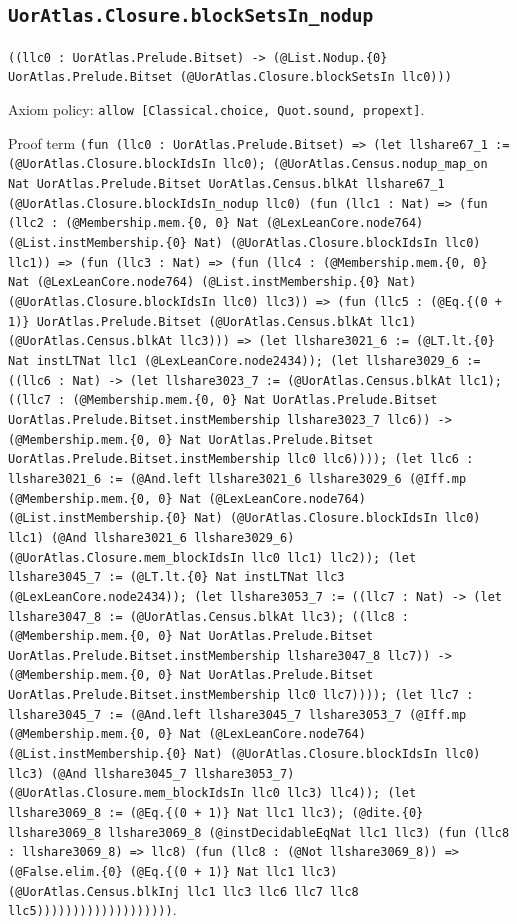 \documentclass[11pt]{article}
\begin{document}
\subsection*{\texttt{UorAtlas.Closure.blockSetsIn\_nodup}}
\noindent\texttt{((llc0 : UorAtlas.Prelude.Bitset) -> (@List.Nodup.\{0\} UorAtlas.Prelude.Bitset (@UorAtlas.Closure.blockSetsIn llc0)))}\par
\noindent Axiom policy: \texttt{allow [Classical.choice, Quot.sound, propext]}.\par
\noindent Proof term \texttt{(fun (llc0 : UorAtlas.Prelude.Bitset) => (let llshare67\_1 := (@UorAtlas.Closure.blockIdsIn llc0); (@UorAtlas.Census.nodup\_map\_on Nat UorAtlas.Prelude.Bitset UorAtlas.Census.blkAt llshare67\_1 (@UorAtlas.Closure.blockIdsIn\_nodup llc0) (fun (llc1 : Nat) => (fun (llc2 : (@Membership.mem.\{0, 0\} Nat (@LexLeanCore.node764) (@List.instMembership.\{0\} Nat) (@UorAtlas.Closure.blockIdsIn llc0) llc1)) => (fun (llc3 : Nat) => (fun (llc4 : (@Membership.mem.\{0, 0\} Nat (@LexLeanCore.node764) (@List.instMembership.\{0\} Nat) (@UorAtlas.Closure.blockIdsIn llc0) llc3)) => (fun (llc5 : (@Eq.\{(0 + 1)\} UorAtlas.Prelude.Bitset (@UorAtlas.Census.blkAt llc1) (@UorAtlas.Census.blkAt llc3))) => (let llshare3021\_6 := (@LT.lt.\{0\} Nat instLTNat llc1 (@LexLeanCore.node2434)); (let llshare3029\_6 := ((llc6 : Nat) -> (let llshare3023\_7 := (@UorAtlas.Census.blkAt llc1); ((llc7 : (@Membership.mem.\{0, 0\} Nat UorAtlas.Prelude.Bitset UorAtlas.Prelude.Bitset.instMembership llshare3023\_7 llc6)) -> (@Membership.mem.\{0, 0\} Nat UorAtlas.Prelude.Bitset UorAtlas.Prelude.Bitset.instMembership llc0 llc6)))); (let llc6 : llshare3021\_6 := (@And.left llshare3021\_6 llshare3029\_6 (@Iff.mp (@Membership.mem.\{0, 0\} Nat (@LexLeanCore.node764) (@List.instMembership.\{0\} Nat) (@UorAtlas.Closure.blockIdsIn llc0) llc1) (@And llshare3021\_6 llshare3029\_6) (@UorAtlas.Closure.mem\_blockIdsIn llc0 llc1) llc2)); (let llshare3045\_7 := (@LT.lt.\{0\} Nat instLTNat llc3 (@LexLeanCore.node2434)); (let llshare3053\_7 := ((llc7 : Nat) -> (let llshare3047\_8 := (@UorAtlas.Census.blkAt llc3); ((llc8 : (@Membership.mem.\{0, 0\} Nat UorAtlas.Prelude.Bitset UorAtlas.Prelude.Bitset.instMembership llshare3047\_8 llc7)) -> (@Membership.mem.\{0, 0\} Nat UorAtlas.Prelude.Bitset UorAtlas.Prelude.Bitset.instMembership llc0 llc7)))); (let llc7 : llshare3045\_7 := (@And.left llshare3045\_7 llshare3053\_7 (@Iff.mp (@Membership.mem.\{0, 0\} Nat (@LexLeanCore.node764) (@List.instMembership.\{0\} Nat) (@UorAtlas.Closure.blockIdsIn llc0) llc3) (@And llshare3045\_7 llshare3053\_7) (@UorAtlas.Closure.mem\_blockIdsIn llc0 llc3) llc4)); (let llshare3069\_8 := (@Eq.\{(0 + 1)\} Nat llc1 llc3); (@dite.\{0\} llshare3069\_8 llshare3069\_8 (@instDecidableEqNat llc1 llc3) (fun (llc8 : llshare3069\_8) => llc8) (fun (llc8 : (@Not llshare3069\_8)) => (@False.elim.\{0\} (@Eq.\{(0 + 1)\} Nat llc1 llc3) (@UorAtlas.Census.blkInj llc1 llc3 llc6 llc7 llc8 llc5)))))))))))))))))))}.\par
\end{document}
